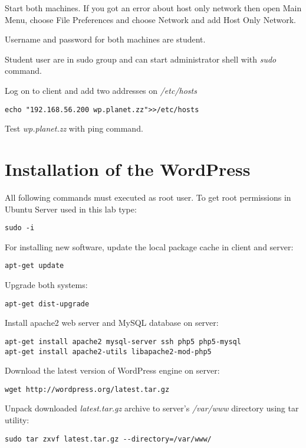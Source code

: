 Start both machines. 
{\small{If you got an error about host only network then open Main Menu, choose File Preferences and choose Network and add Host Only Network.}}

Username and password for both machines are student.

Student user are in sudo group and can start administrator shell with \emph{sudo} command.

Log on to client and add two addresses on \emph{/etc/hosts}
\begin{verbatim}
echo "192.168.56.200 wp.planet.zz">>/etc/hosts
\end{verbatim}

Test \emph{wp.planet.zz} with ping command.

\section{Installation of the WordPress}
All following commands must executed as root user. To get root permissions in Ubuntu Server used in this lab type:
\begin{verbatim}
sudo -i
\end{verbatim}

For installing new software, update the local package cache in client and server:
\begin{verbatim}
apt-get update
\end{verbatim}

Upgrade both systems:
\begin{verbatim}
apt-get dist-upgrade
\end{verbatim}

Install apache2 web server and \gls{MySQL} database on server:
\begin{verbatim}
apt-get install apache2 mysql-server ssh php5 php5-mysql 
apt-get install apache2-utils libapache2-mod-php5
\end{verbatim}

Download the latest version of WordPress engine on server:
\begin{verbatim}
wget http://wordpress.org/latest.tar.gz
\end{verbatim}

Unpack downloaded \emph{latest.tar.gz} archive to server's \emph{/var/www} directory using tar utility:
\begin{verbatim}
sudo tar zxvf latest.tar.gz --directory=/var/www/
\end{verbatim}

